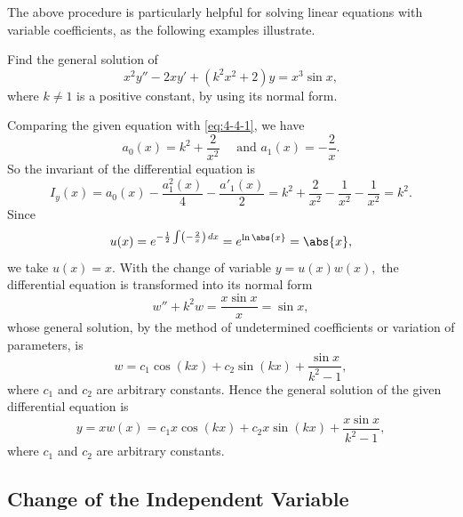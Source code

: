 The above procedure is particularly helpful for solving linear equations with variable coefficients, as the following examples illustrate.

\begin{example}
Find the general solution of 
\[x^2y'' -2xy' + (k^2x^2+2)y = x^3\sin x,\] where $k\ne 1$ is a positive constant, by using its normal form.
\end{example}
\begin{solution}
	 Comparing the given  equation with \eqref{eq:4-4-1}, we have 
	 \[ a_0(x) = k^2+\frac{2}{x^2} \quad \text{ and } a_1(x) = - \frac{2}{x}.\]
	 So the invariant of the differential equation is
	 \[I_y(x) = a_0(x)-\frac{a_1^2(x)}{4}-\frac{a'_1(x)}{2} =k^2+\frac{2}{x^2}-\frac{1}{x^2}- \frac{1}{x^2} = k^2.\]
	 Since \[u(x) = e^{-\frac{1}{2}\int \left(-\frac{2}{x}\right)\, dx} = e^{\ln\abs{x}} = \abs{x}, \]
	 we  take $u(x) = x.$ With the change of variable \(y = u(x) w(x),\) the differential equation is transformed into its  normal form 
	 \[ w'' + k^2 w = \frac{x\sin x}{x}  = \sin x,\] whose general solution, by the method of undetermined coefficients or variation of parameters, is
	 \[w=c_1 \cos (k x)+c_2 \sin (k x)+\frac{\sin x}{k^2-1},\]
	 where $c_1$ and $c_2$ are arbitrary constants. Hence the general solution of the given differential equation is
	 \[y = x w(x) = c_1 x \cos (k x)+c_2 x \sin (k x)+\frac{x\sin x}{k^2-1},\]
	 where $c_1$ and $c_2$ are arbitrary constants.
\end{solution}

\subsection{Change of the Independent Variable}\label{subsec:4-5-1}

